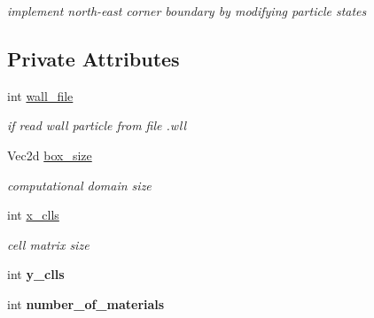 \begin{CompactItemize}
\begin{CompactList}\small\item\em implement north-east corner boundary by modifying particle states \item\end{CompactList}\end{CompactItemize}
\subsection*{Private Attributes}
\begin{CompactItemize}
\item 
\hypertarget{classBoundary_0033d4ccb76b4fa29d2addda930dd572}{
int \hyperlink{classBoundary_0033d4ccb76b4fa29d2addda930dd572}{wall\_\-file}}
\label{classBoundary_0033d4ccb76b4fa29d2addda930dd572}

\begin{CompactList}\small\item\em if read wall particle from file .wll \item\end{CompactList}\item 
\hypertarget{classBoundary_e9c27eae4f9ac0853a089aa4d0c76904}{
Vec2d \hyperlink{classBoundary_e9c27eae4f9ac0853a089aa4d0c76904}{box\_\-size}}
\label{classBoundary_e9c27eae4f9ac0853a089aa4d0c76904}

\begin{CompactList}\small\item\em computational domain size \item\end{CompactList}\item 
\hypertarget{classBoundary_d6bdf67458e91f78f5679f450eee8e29}{
int \hyperlink{classBoundary_d6bdf67458e91f78f5679f450eee8e29}{x\_\-clls}}
\label{classBoundary_d6bdf67458e91f78f5679f450eee8e29}

\begin{CompactList}\small\item\em cell matrix size \item\end{CompactList}\item 
\hypertarget{classBoundary_9066d15cdf92a6d522344e037ed51503}{
int \textbf{y\_\-clls}}
\label{classBoundary_9066d15cdf92a6d522344e037ed51503}

\item 
\hypertarget{classBoundary_ad5dca4ff83933fafee8a858011ab56a}{
int \textbf{number\_\-of\_\-materials}}
\label{classBoundary_ad5dca4ff83933fafee8a858011ab56a}

\end{CompactItemize}


